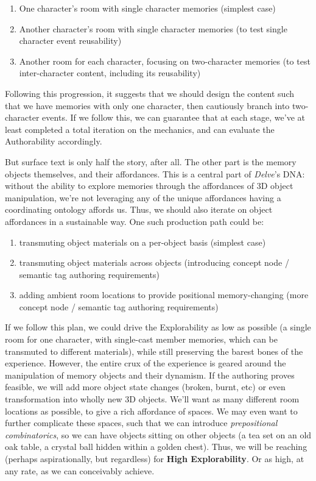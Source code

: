 \begin{enumerate}
    \item One character's room with single character memories (simplest case)
    \item Another character's room with single character memories (to test single character event reusability)
    \item Another room for each character, focusing on two-character memories (to test inter-character content, including its reusability)
\end{enumerate}

Following this progression, it suggests that we should design the content such that we have memories with only one character, then cautiously branch into two-character events. If we follow this, we can guarantee that at each stage, we've at least completed a total iteration on the mechanics, and can evaluate the Authorability accordingly.

But surface text is only half the story, after all. The other part is the memory objects themselves, and their affordances. This is a central part of \textit{Delve}'s DNA: without the ability to explore memories through the affordances of 3D object manipulation, we're not leveraging any of the unique affordances having a coordinating ontology affords us. Thus, we should also iterate on object affordances in a sustainable way. One such production path could be:

\begin{enumerate}
    \item transmuting object materials on a per-object basis (simplest case)
    \item transmuting object materials across objects (introducing concept node / semantic tag authoring requirements)
    \item adding ambient room locations to provide positional memory-changing (more concept node / semantic tag authoring requirements)
\end{enumerate}

If we follow this plan, we could drive the Explorability as low as possible (a single room for one character, with single-cast member memories, which can be transmuted to different materials), while still preserving the barest bones of the experience. However, the entire crux of the experience is geared around the manipulation of memory objects and their dynamism. If the authoring proves feasible, we will add more object state changes (broken, burnt, etc) or even transformation into wholly new 3D objects. We'll want as many different room locations as possible, to give a rich affordance of spaces. We may even want to further complicate these spaces, such that we can introduce \textit{prepositional combinatorics}, so we can have objects sitting on other objects (a tea set on an old oak table, a crystal ball hidden within a golden chest). Thus, we will be reaching (perhaps aspirationally, but regardless) for \textbf{High Explorability}. Or as high, at any rate, as we can conceivably achieve.

